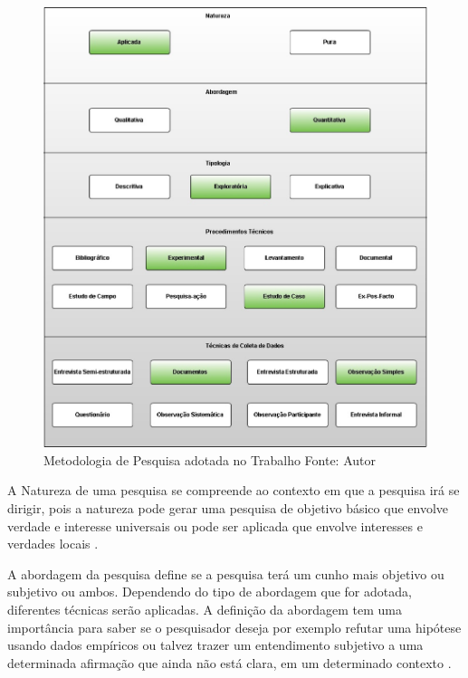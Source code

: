         \begin{figure}[ht!]
        \centering
            \includegraphics[keepaspectratio=true,scale=0.5]
                                      {figuras/figura20.eps}
                \caption[Metodologia de Pesquisa adotada no Trabalho]{Metodologia de Pesquisa adotada no Trabalho
                \protect\linebreak Fonte: Autor}
                \label{figura20}
        \end{figure}

        A Natureza de uma pesquisa se compreende ao contexto em que a pesquisa irá se dirigir, pois a natureza pode gerar uma
        pesquisa de objetivo básico que envolve verdade e interesse universais ou pode ser aplicada que envolve interesses e
        verdades locais \cite{lakatos2010}.

        A abordagem da pesquisa define se a pesquisa terá um cunho mais objetivo ou subjetivo ou ambos. Dependendo do tipo de
        abordagem que for adotada, diferentes técnicas serão aplicadas. A definição da abordagem tem uma importância para saber
        se o pesquisador deseja por exemplo refutar uma hipótese usando dados empíricos ou talvez trazer um entendimento
        subjetivo a uma determinada afirmação que ainda não está clara, em um determinado contexto \cite{prodanov2013}.

